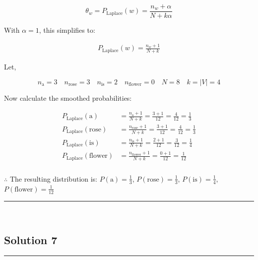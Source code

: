 \documentclass{article}
\begin{document}
$$\theta_w = P_{\text{Laplace}}(w) = \frac{n_w + \alpha}{N + k\alpha}$$

\begin{flushleft}
    With $\alpha=1$, this simplifies to:
\end{flushleft}

\begin{align*}
    P_{\text{Laplace}}(w) = \frac{n_w + 1}{N + k}
\end{align*}

\begin{flushleft}
    Let,
\end{flushleft}
$$n_{\mathrm{a}}=3 \quad n_{\mathrm{rose}}=3 \quad n_{\mathrm{is}}=2 \quad n_{\mathrm{flower}}=0 \quad N = 8 \quad k = |V| = 4$$

\begin{flushleft}
    Now calculate the smoothed probabilities:
\end{flushleft}

\begin{align*}
    P_{\text{Laplace}}(\mathrm{a}) &= \frac{n_{\mathrm{a}} + 1}{N + k} = \frac{3 + 1}{12} = \frac{4}{12} = \frac{1}{3} \\
    P_{\text{Laplace}}(\mathrm{rose}) &= \frac{n_{\mathrm{rose}} + 1}{N + k} = \frac{3 + 1}{12} = \frac{4}{12} = \frac{1}{3} \\
    P_{\text{Laplace}}(\mathrm{is}) &= \frac{n_{\mathrm{is}} + 1}{N + k} = \frac{2 + 1}{12} = \frac{3}{12} = \frac{1}{4} \\
    P_{\text{Laplace}}(\mathrm{flower}) &= \frac{n_{\mathrm{flower}} + 1}{N + k} = \frac{0 + 1}{12} = \frac{1}{12}
\end{align*}

\subsubsection*{\normalfont}{$\therefore$ The resulting distribution is: $P(\mathrm{a}) = \frac{1}{3}$, $P(\mathrm{rose}) = \frac{1}{3}$, $P(\mathrm{is}) = \frac{1}{4}$, $P(\mathrm{flower}) = \frac{1}{12}$} \\

\noindent\rule{\textwidth}{0.4pt}\\

\newpage

\subsection*{Solution 7}
\noindent\rule{\textwidth}{0.4pt}\\
\end{document}
